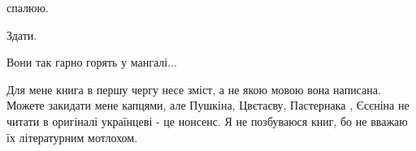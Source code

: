 спалюю.

 
Здати.

 
Вони так гарно горять у мангалі...

 

Для мене книга в першу чергу несе зміст, а не якою мовою вона написана. Можете
закидати мене капцями, але Пушкіна, Цвєтаєву, Пастернака , Єсєніна не читати в
оригіналі українцеві - це нонсенс. Я не позбуваюся книг, бо не вважаю їх
літературним мотлохом.

